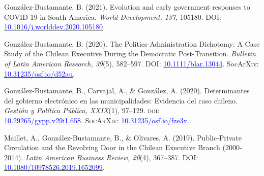 \begin{publications}
\begin{benumerate}{10}
\item{González-Bustamante, B. (2021). Evolution and early government responses to COVID-19 in South America. {\itshape World Development, 137}, 105180. DOI: \href{https://doi.org/10.1016/j.worlddev.2020.105180}{\textcolor{blue}{10.1016/j.worlddev.2020.105180}}.}\vspace{1mm}


\item{González-Bustamante, B. (2020). The Politics-Administration Dichotomy: A Case Study of the Chilean Executive During the Democratic Post-Transition. {\itshape Bulletin of Latin American Research, 39}(5), 582--597. DOI: \href{https://doi.org/10.1111/blar.13044}{\textcolor{blue}{10.1111/blar.13044}}. SocArXiv: \href{https://doi.org/10.31235/osf.io/d52au}{\textcolor{blue}{10.31235/osf.io/d52au}}.}\vspace{1mm}

\item{González-Bustamante, B., Carvajal, A., \& González, A. (2020). Determinantes del gobierno electrónico en las municipalidades: Evidencia del caso chileno. {\itshape Gestión y Política Pública, XXIX}(1), 97--129. {\scshape doi:} \\ \href{http://dx.doi.org/10.29265/gypp.v29i1.658}{\textcolor{blue}{10.29265/gypp.v29i1.658}}. {\scshape \footnotesize SocArXiv:} \href{https://doi.org/10.31235/osf.io/fze3x}{\textcolor{blue}{10.31235/osf.io/fze3x}}.} \vspace{1mm}

\item{Maillet, A., González-Bustamante, B., \& Olivares, A. (2019). Public-Private Circulation and the Revolving Door in the Chilean Executive Branch (2000-2014). {\itshape Latin American Business Review, 20}(4), 367--387. DOI: \href{https://doi.org/10.1080/10978526.2019.1652099}{\textcolor{blue}{10.1080/10978526.2019.1652099}}.}\vspace{1mm}


\end{benumerate}
\end{publications}
